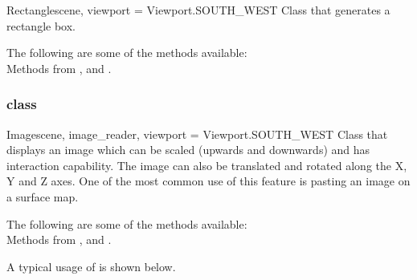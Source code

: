 \begin{classdesc}{Rectangle}{scene, viewport = Viewport.SOUTH_WEST}
Class that generates a rectangle box.
\end{classdesc}

The following are some of the methods available:\\
Methods from \ActorThreeD, \CubeSource and \DataSetMapper.

\subsubsection{\Image class}

\begin{classdesc}{Image}{scene, image_reader, viewport = Viewport.SOUTH_WEST}
Class that displays an image which can be scaled (upwards and downwards) and
has interaction capability. The image can also be translated and rotated along 
the X, Y and Z axes. One of the most common use of this feature is pasting an 
image on a surface map.
\end{classdesc}

The following are some of the methods available:\\
Methods from \ActorThreeD, \PlaneSource and \Transform.

A typical usage of \Image is shown below.

